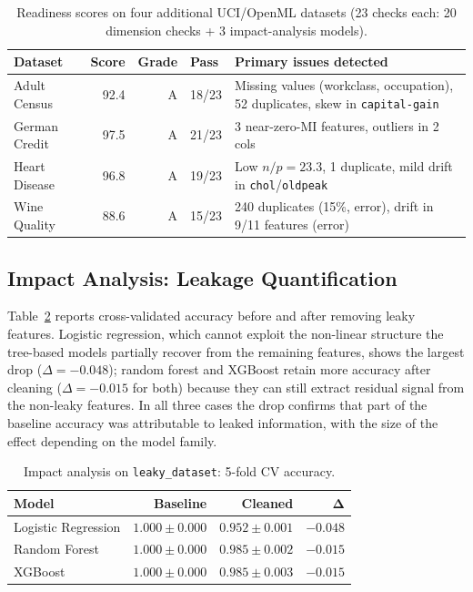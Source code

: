 \documentclass[11pt]{article}
\begin{document}
\begin{table}[!h]
\centering
\caption{Readiness scores on four additional UCI/OpenML datasets (23 checks
  each: 20 dimension checks + 3 impact-analysis models).}
\label{tab:uci}
\small
\begin{tabularx}{\columnwidth}{lrrlX}
\toprule
\textbf{Dataset} & \textbf{Score} & \textbf{Grade} & \textbf{Pass} & \textbf{Primary issues detected} \\
\midrule
Adult Census & 92.4 & A & 18/23 & Missing values (workclass, occupation), 52 duplicates, skew in \texttt{capital-gain} \\
German Credit & 97.5 & A & 21/23 & 3 near-zero-MI features, outliers in 2 cols \\
Heart Disease & 96.8 & A & 19/23 & Low $n/p=23.3$, 1 duplicate, mild drift in \texttt{chol}/\texttt{oldpeak} \\
Wine Quality & 88.6 & A & 15/23 & 240 duplicates (15\%, error), drift in 9/11 features (error) \\
\bottomrule
\end{tabularx}
\end{table}

\subsection{Impact Analysis: Leakage Quantification}

Table~\ref{tab:impact} reports cross-validated accuracy before and after
removing leaky features.  Logistic regression, which cannot exploit the
non-linear structure the tree-based models partially recover from the
remaining features, shows the largest drop ($\Delta=-0.048$); random forest
and XGBoost retain more accuracy after cleaning ($\Delta=-0.015$ for both)
because they can still extract residual signal from the non-leaky features.
In all three cases the drop confirms that part of the baseline accuracy was
attributable to leaked information, with the size of the effect depending
on the model family.

\begin{table}[!h]
\centering
\caption{Impact analysis on \texttt{leaky\_dataset}: 5-fold CV accuracy.}
\label{tab:impact}
\scriptsize
\begin{tabular}{lrrr}
\toprule
\textbf{Model} & \textbf{Baseline} & \textbf{Cleaned} & $\boldsymbol{\Delta}$ \\
\midrule
Logistic Regression & $1.000\pm0.000$ & $0.952\pm0.001$ & $-0.048$ \\
Random Forest       & $1.000\pm0.000$ & $0.985\pm0.002$ & $-0.015$ \\
XGBoost             & $1.000\pm0.000$ & $0.985\pm0.003$ & $-0.015$ \\
\bottomrule
\end{tabular}
\end{table}
\end{document}
